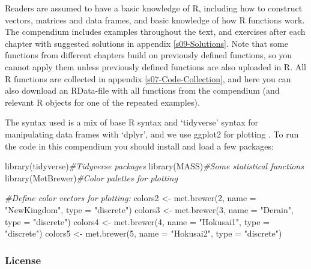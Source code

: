 \documentclass[
]{book}
\newenvironment{Shaded}{\begin{snugshade}}{\end{snugshade}}
\newcommand{\AttributeTok}[1]{\textcolor[rgb]{0.77,0.63,0.00}{#1}}
\newcommand{\CommentTok}[1]{\textcolor[rgb]{0.56,0.35,0.01}{\textit{#1}}}
\newcommand{\DecValTok}[1]{\textcolor[rgb]{0.00,0.00,0.81}{#1}}
\newcommand{\FunctionTok}[1]{\textcolor[rgb]{0.00,0.00,0.00}{#1}}
\newcommand{\NormalTok}[1]{#1}
\newcommand{\OtherTok}[1]{\textcolor[rgb]{0.56,0.35,0.01}{#1}}
\newcommand{\StringTok}[1]{\textcolor[rgb]{0.31,0.60,0.02}{#1}}
\begin{document}
Readers are assumed to have a basic knowledge of R, including how to construct vectors, matrices and data frames, and basic knowledge of how R functions work. The compendium includes examples throughout the text, and exercises after each chapter with suggested solutions in appendix \ref{s09-Solutions}. Note that some functions from different chapters build on previously defined functions, so you cannot apply them unless previously defined functions are also uploaded in R. All R functions are collected in appendix \ref{s07-Code-Collection}, and here you can also download an RData-file with all functions from the compendium (and relevant R objects for one of the repeated examples).

The syntax used is a mix of base R syntax and `tidyverse' syntax for manipulating data frames with `dplyr', and we use ggplot2 for plotting \citep{tidyverse}. To run the code in this compendium you should install and load a few packages:

\begin{Shaded}
\begin{Highlighting}[]
\FunctionTok{library}\NormalTok{(tidyverse)}\CommentTok{\#Tidyverse packages}
\FunctionTok{library}\NormalTok{(MASS)}\CommentTok{\#Some statistical functions}
\FunctionTok{library}\NormalTok{(MetBrewer)}\CommentTok{\#Color palettes for plotting}

\CommentTok{\#Define color vectors for plotting:}
\NormalTok{colors2 }\OtherTok{\textless{}{-}} \FunctionTok{met.brewer}\NormalTok{(}\DecValTok{2}\NormalTok{, }\AttributeTok{name =} \StringTok{"NewKingdom"}\NormalTok{, }\AttributeTok{type =} \StringTok{"discrete"}\NormalTok{)}
\NormalTok{colors3 }\OtherTok{\textless{}{-}} \FunctionTok{met.brewer}\NormalTok{(}\DecValTok{3}\NormalTok{, }\AttributeTok{name =} \StringTok{"Derain"}\NormalTok{, }\AttributeTok{type =} \StringTok{"discrete"}\NormalTok{)}
\NormalTok{colors4 }\OtherTok{\textless{}{-}} \FunctionTok{met.brewer}\NormalTok{(}\DecValTok{4}\NormalTok{, }\AttributeTok{name =} \StringTok{"Hokusai1"}\NormalTok{, }\AttributeTok{type =} \StringTok{"discrete"}\NormalTok{)}
\NormalTok{colors5 }\OtherTok{\textless{}{-}} \FunctionTok{met.brewer}\NormalTok{(}\DecValTok{5}\NormalTok{, }\AttributeTok{name =} \StringTok{"Hokusai2"}\NormalTok{, }\AttributeTok{type =} \StringTok{"discrete"}\NormalTok{)}
\end{Highlighting}
\end{Shaded}

\hypertarget{license}{%
\subsubsection*{License}\label{license}}
\end{document}
